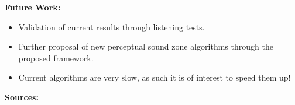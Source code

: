 \documentclass[aspectratio=169]{beamer}
\begin{document}
\begin{frame}{\textbf{Future Work:}}
    \begin{itemize}
        \item Validation of current results through listening tests. 
        \item Further proposal of new perceptual sound zone algorithms through the proposed framework.
        \item Current algorithms are very slow, as such it is of interest to speed them up!
    \end{itemize}
\end{frame}

\begin{frame}{\textbf{Sources:}}
    \begin{columns}[c]
        \printbibliography
    \end{columns}
\end{frame}
\end{document}
